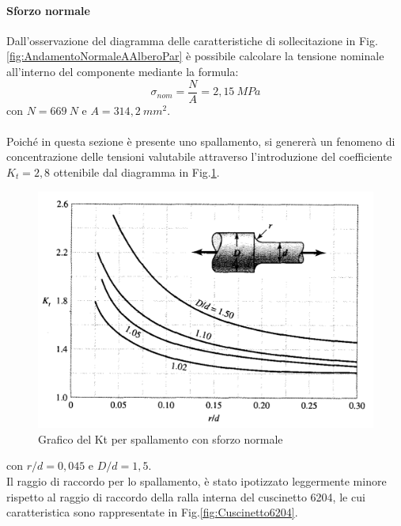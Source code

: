 \paragraph{Sforzo normale} Dall'osservazione del diagramma delle caratteristiche di sollecitazione in Fig.\ref{fig:AndamentoNormaleAAlberoPar} è possibile calcolare la tensione nominale all'interno del componente mediante la formula:
\begin{equation}
    \sigma_{nom}=\frac{N}{A}=2,15\ MPa
\end{equation}
con $N=669\ N$ e $A=314,2\ mm^2$.\\
\\
Poiché in questa sezione è presente uno spallamento, si genererà un fenomeno di concentrazione delle tensioni valutabile attraverso l'introduzione del coefficiente $K_t=2,8$ ottenibile dal diagramma in Fig.\ref{fig:KtSpallamentoNormale}. 
\begin{figure}[h]
    \centering
    \includegraphics[scale=0.3]{Immagini/KtSpallementoNormale.png}
    \caption{Grafico del Kt per spallamento con sforzo normale}
    \label{fig:KtSpallamentoNormale}
\end{figure}
con $r/d=0,045$ e $D/d=1,5$.\\
Il raggio di raccordo per lo spallamento, è stato ipotizzato leggermente minore rispetto al raggio di raccordo della ralla interna del cuscinetto 6204, le cui caratteristica sono rappresentate in Fig.\ref{fig:Cuscinetto6204}.
